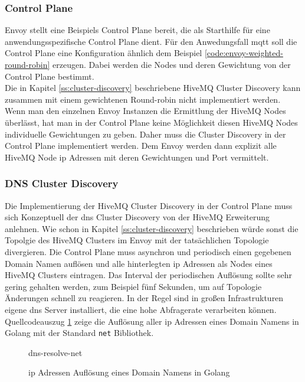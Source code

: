 \subsubsection{Control Plane}
Envoy stellt eine Beispiels Control Plane \cite{DynamicConfigurationControl} bereit, die als Starthilfe für eine anwendungsspezifische Control Plane dient. Für den Anwedungsfall \ac{mqtt} soll die Control Plane eine Konfiguration ähnlich dem Beispiel \ref{code:envoy-weighted-round-robin} erzeugen. Dabei werden die Nodes und deren Gewichtung von der Control Plane bestimmt.
\\
Die in Kapitel \ref{ss:cluster-discovery} beschriebene HiveMQ Cluster Discovery kann zusammen mit einem gewichtenen Round-robin nicht implementiert werden. Wenn man den einzelnen Envoy Instanzen die Ermittlung der HiveMQ Nodes überlässt, hat man in der Control Plane keine Möglichkeit diesen HiveMQ Nodes individuelle Gewichtungen zu geben. Daher muss die Cluster Discovery in der Control Plane implementiert werden. Dem Envoy werden dann explizit alle HiveMQ Node \ac{ip} Adressen mit deren Gewichtungen und Port vermittelt.

\subsubsection{DNS Cluster Discovery}
Die Implementierung der HiveMQ Cluster Discovery in der Control Plane muss sich Konzeptuell der \ac{dns} Cluster Discovery von der HiveMQ Erweiterung anlehnen. Wie schon in Kapitel \ref{ss:cluster-discovery} beschrieben würde sonst die Topolgie des HiveMQ Clusters im Envoy mit der tatsächlichen Topologie divergieren.
Die Control Plane muss asynchron und periodisch einen gegebenen Domain Namen auflösen und alle hinterlegten \ac{ip} Adressen als Nodes eines HiveMQ Clusters eintragen. Das Interval der periodischen Auflösung sollte sehr gering gehalten werden, zum Beispiel fünf Sekunden, um auf Topologie Änderungen schnell zu reagieren. In der Regel sind in gro{\ss}en Infrastrukturen eigene \ac{dns} Server installiert, die eine hohe Abfragerate verarbeiten können.
Quellcodeauszug \ref{code:dns-resolve-net} zeige die Auflösung aller \ac{ip} Adressen eines Domain Namens in Golang mit der Standard \verb|net| Bibliothek.
\begin{figure}
    {dns-resolve-net}
    \caption{\ac{ip} Adressen Auflösung eines Domain Namens in Golang}
    \label{code:dns-resolve-net}
\end{figure}

